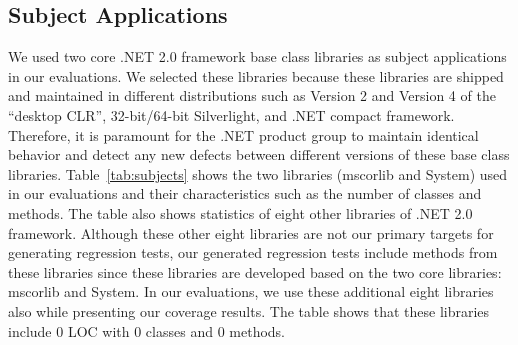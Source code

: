 \subsection{Subject Applications}

We used two core .NET 2.0 framework base class libraries as subject applications in our evaluations. We selected these libraries because these libraries are shipped and maintained in different distributions such as Version 2 and Version 4 of the ``desktop CLR'', 32-bit/64-bit Silverlight, and .NET compact framework. Therefore, it is paramount for the .NET product group to maintain identical behavior and detect any new defects between different versions of these base class libraries. Table~\ref{tab:subjects} shows the two libraries (mscorlib and System) used in our evaluations and their characteristics such as the number of classes and methods. The table also shows statistics of eight other libraries of .NET 2.0 framework. Although these other eight libraries are not our primary targets for generating regression tests, our generated regression tests include methods from these libraries since these libraries are developed based on the two core libraries: mscorlib and System. In our evaluations, we use these additional eight libraries also while presenting our coverage results. The table shows that these libraries include $0$ LOC with $0$ classes and $0$ methods.

